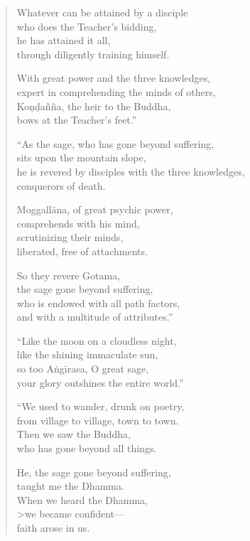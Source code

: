 \documentclass[12pt,openany]{book}%
\begin{document}
\begin{verse}
Whatever can be attained by a disciple \\
who does the Teacher’s bidding, \\
he has attained it all, \\
through diligently training himself. 

With great power and the three knowledges, \\
expert in comprehending the minds of others, \\
\textsanskrit{Koṇḍañña}, the heir to the Buddha, \\
bows at the Teacher’s feet.” 

“As the sage, who has gone beyond suffering, \\
sits upon the mountain slope, \\
he is revered by disciples with the three knowledges, \\
conquerors of death. 

\textsanskrit{Moggallāna}, of great psychic power, \\
comprehends with his mind, \\
scrutinizing their minds, \\
liberated, free of attachments. 

So they revere Gotama, \\
the sage gone beyond suffering, \\
who is endowed with all path factors, \\
and with a multitude of attributes.” 

“Like the moon on a cloudless night, \\
like the shining immaculate sun, \\
so too \textsanskrit{Aṅgīrasa}, O great sage, \\
your glory outshines the entire world.” 

“We used to wander, drunk on poetry, \\
from village to village, town to town. \\
Then we saw the Buddha, \\
who has gone beyond all things. 

He, the sage gone beyond suffering, \\
taught me the Dhamma. \\
When we heard the Dhamma, \\>we became confident—\\
faith arose in us. 


\end{verse}
\end{document}
